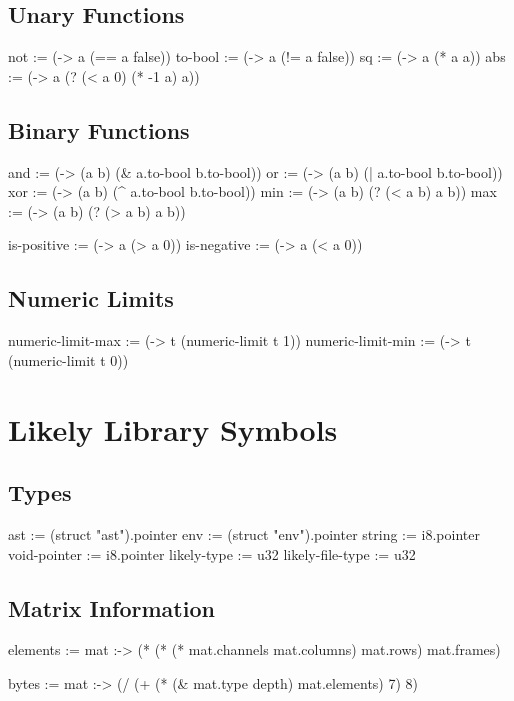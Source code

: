 \documentclass[twoside=false, numbers=noenddot]{scrbook}
\newenvironment{likely}
{ \verbatim }
{ \endverbatim }
\begin{document}
\section{Unary Functions}
\begin{likely}
not     := (-> a (== a false))
to-bool := (-> a (!= a false))
sq      := (-> a (* a a))
abs     := (-> a (? (< a 0) (* -1 a) a))
\end{likely}

\section{Binary Functions}
\begin{likely}
and := (-> (a b) (& a.to-bool b.to-bool))
or  := (-> (a b) (| a.to-bool b.to-bool))
xor := (-> (a b) (^ a.to-bool b.to-bool))
min := (-> (a b) (? (< a b) a b))
max := (-> (a b) (? (> a b) a b))

is-positive := (-> a (> a 0))
is-negative := (-> a (< a 0))
\end{likely}

\section{Numeric Limits}
\begin{likely}
numeric-limit-max := (-> t (numeric-limit t 1))
numeric-limit-min := (-> t (numeric-limit t 0))
\end{likely}

\chapter{Likely Library Symbols}
\section{Types}
\begin{likely}
ast := (struct "ast").pointer
env := (struct "env").pointer
string       := i8.pointer
void-pointer := i8.pointer
likely-type      := u32
likely-file-type := u32
\end{likely}

\section{Matrix Information}
\begin{likely}
elements :=
  mat :->
    (* (* (* mat.channels mat.columns) mat.rows) mat.frames)

bytes :=
  mat :->
    (/ (+ (* (& mat.type depth) mat.elements) 7) 8)
\end{likely}
\end{document}
